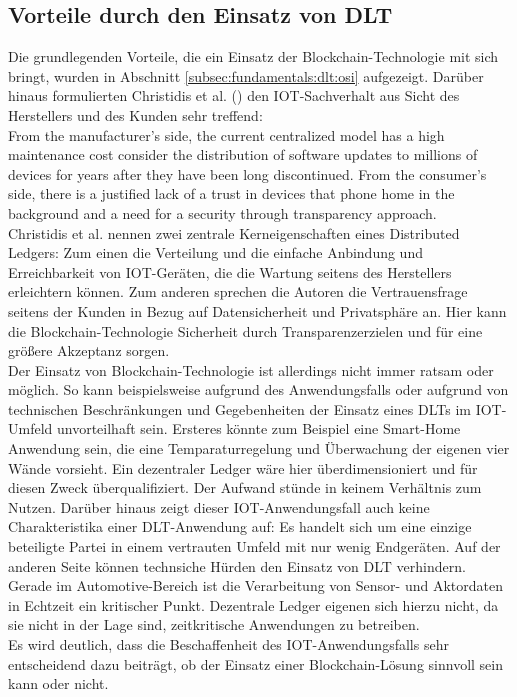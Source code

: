 \subsection{Vorteile durch den Einsatz von DLT}
\label{subsec:fundamentals:iot:dlt_iot}
Die grundlegenden Vorteile, die ein Einsatz der Blockchain-Technologie mit sich bringt, wurden in Abschnitt \ref{subsec:fundamentals:dlt:osi} aufgezeigt. Darüber hinaus formulierten Christidis et al. (\cite{SCIOT2016}) den IOT-Sachverhalt aus Sicht des Herstellers und des Kunden sehr treffend:\\
\glqq From the manufacturer's side, the current centralized model has a high maintenance cost consider the distribution of software updates to millions of devices for years after they have been long discontinued. From the consumer's side, there is a justified lack of a trust in devices that phone home in the background and a need for a security through transparency approach.\grqq\\
Christidis et al. nennen zwei zentrale Kerneigenschaften eines Distributed Ledgers: Zum einen die Verteilung und die einfache Anbindung und Erreichbarkeit von \ac{IOT}-Geräten, die die Wartung seitens des Herstellers erleichtern können. Zum anderen sprechen die Autoren die Vertrauensfrage seitens der Kunden in Bezug auf Datensicherheit und Privatsphäre an. Hier kann die Blockchain-Technologie \glqq Sicherheit durch Transparenz\grqq erzielen und für eine größere Akzeptanz sorgen.\\
Der Einsatz von Blockchain-Technologie ist allerdings nicht immer ratsam oder möglich. So kann beispielsweise aufgrund des Anwendungsfalls oder aufgrund von technischen Beschränkungen und Gegebenheiten der Einsatz eines \ac{DLT}s im \ac{IOT}-Umfeld unvorteilhaft sein. Ersteres könnte zum Beispiel eine Smart-Home Anwendung sein, die eine Temparaturregelung und Überwachung der eigenen vier Wände vorsieht. Ein dezentraler Ledger wäre hier überdimensioniert und für diesen Zweck überqualifiziert. Der Aufwand stünde in keinem Verhältnis zum Nutzen. Darüber hinaus zeigt dieser \ac{IOT}-Anwendungsfall auch keine Charakteristika einer \ac{DLT}-Anwendung auf: Es handelt sich um eine einzige beteiligte Partei in einem vertrauten Umfeld mit nur wenig Endgeräten. Auf der anderen Seite können technsiche Hürden den Einsatz von \ac{DLT} verhindern. Gerade im Automotive-Bereich ist die Verarbeitung von Sensor- und Aktordaten in Echtzeit ein kritischer Punkt. Dezentrale Ledger eigenen sich hierzu nicht, da sie nicht in der Lage sind, zeitkritische Anwendungen zu betreiben.\\
Es wird deutlich, dass die Beschaffenheit des \ac{IOT}-Anwendungsfalls sehr entscheidend dazu beiträgt, ob der Einsatz einer Blockchain-Lösung sinnvoll sein kann oder nicht.

